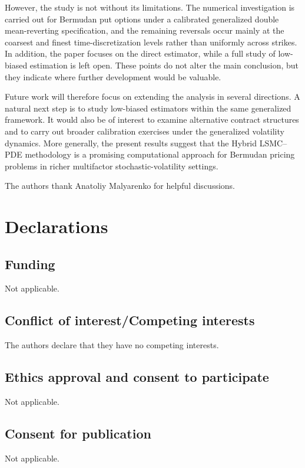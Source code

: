 \documentclass[pdflatex,sn-mathphys-num]{sn-jnl}
\theoremstyle{thmstyleone}%
\theoremstyle{thmstylethree}%
\theoremstyle{thmstyletwo}%
\begin{document}
However, the study is not without its limitations. The numerical investigation is carried out for Bermudan put options under a calibrated generalized double mean-reverting specification, and the remaining reversals occur mainly at the coarsest and finest time-discretization levels rather than uniformly across strikes. In addition, the paper focuses on the direct estimator, while a full study of low-biased estimation is left open. These points do not alter the main conclusion, but they indicate where further development would be valuable.

Future work will therefore focus on extending the analysis in several directions. A natural next step is to study low-biased estimators within the same generalized framework. It would also be of interest to examine alternative contract structures and to carry out broader calibration exercises under the generalized volatility dynamics. More generally, the present results suggest that the Hybrid LSMC--PDE methodology is a promising computational approach for Bermudan pricing problems in richer multifactor stochastic-volatility settings.



\backmatter

The authors thank Anatoliy Malyarenko for helpful discussions.

\section*{Declarations}

\subsection*{Funding}
Not applicable.

\subsection*{Conflict of interest/Competing interests}
The authors declare that they have no competing interests.

\subsection*{Ethics approval and consent to participate}
Not applicable.

\subsection*{Consent for publication}
Not applicable.
\end{document}
